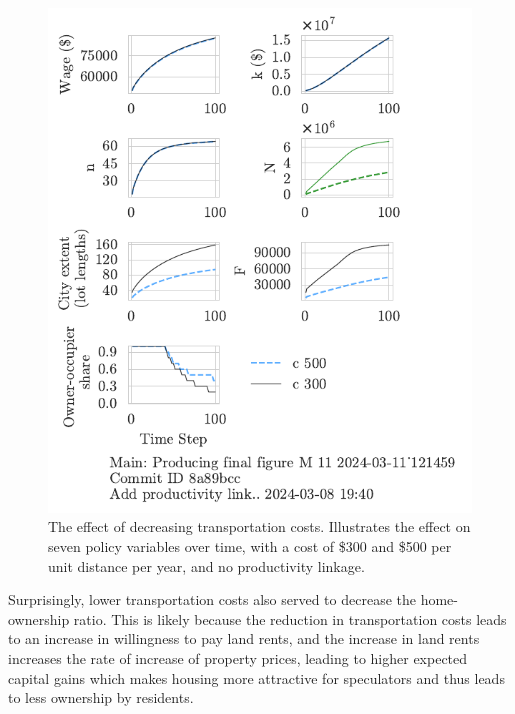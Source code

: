 
\begin{figure}[h!b]
    \centering
    \includegraphics[scale=1, trim={0 1.4cm 0 0},clip]{fig/c-Main-121459.pdf}
    \caption[The effect of decreasing transportation costs]{The effect of decreasing transportation costs. Illustrates the effect on seven policy variables over time, with a cost of \$300 and \$500 per unit distance per year, and no productivity linkage.}
    \label{fig:c_ownership_trajectory}
\end{figure}


Surprisingly, lower transportation costs also served to decrease the home-ownership ratio. This is likely because the reduction in transportation costs leads to an increase in willingness to pay land rents, and the increase in land rents increases the rate of increase of property prices, leading to higher expected capital gains which makes housing more attractive for speculators and thus leads to less ownership by residents. 




